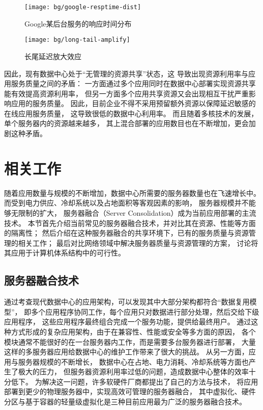 \begin{figure}
\begin{minipage}{0.44\textwidth}
  \centering
  \texttt{[image: bg/google-resptime-dist]}
  \caption[Google某后台服务的响应时间分布]{Google某后台服务的响应时间分布\cite{Krushevskaja:2013}}
  \label{fig:google-resptime-dist}
\end{minipage}\hfill
\begin{minipage}{0.52\textwidth}
  \centering
  \texttt{[image: bg/long-tail-amplify]}
  \caption[长尾延迟放大效应]{长尾延迟放大效应\cite{dean_tail_2013}}
  \label{fig:long-tail-amplify}
\end{minipage}
\end{figure}

因此，现有数据中心处于``无管理的资源共享''状态，这
导致出现资源利用率与应用服务质量之间的矛盾：
一方面通过多个应用同时在数据中心部署实现资源共享能有效提高资源利用率，
但另一方面多个应用共享资源又会出现相互干扰严重影响应用的服务质量。
因此，目前企业不得不采用预留额外资源以保障延迟敏感的在线应用服务质量，
这导致很低的数据中心利用率。
而且随着多核技术的发展，单个服务器内的资源越来越多，
其上混合部署的应用数目也在不断增加，更会加剧这种矛盾。

\section{相关工作}

随着应用数量与规模的不断增加，数据中心所需要的服务器数量也在飞速增长中。
而受到电力供应、冷却系统以及占地面积等客观因素的影响，
服务器规模并不能够无限制的扩大，
服务器融合（Server Consolidation）成为当前应用部署的主流技术。
本节首先介绍当前常见的服务器融合技术，并对比其在资源、性能等方面的隔离性；
然后介绍在这种服务器融合的共享环境下，已有的服务质量与资源管理的相关工作；
最后对比网络领域中解决服务器质量与资源管理的方案，
讨论将其应用于计算机体系结构中的可行性。

\subsection{服务器融合技术}

通过考查现代数据中心的应用架构，可以发现其中大部分架构都符合``数据复用模型''，
即多个应用程序协同工作，每个应用只对数据进行部分处理，然后交给下级应用程序，
这些应用程序最终组合完成一个服务功能，提供给最终用户。
通过这种方式形成的复杂应用架构，由于在兼容性、性能或安全等多方面的原因，
各个模块通常不能很好的在一台服务器内工作，而是需要多台服务器进行部署，
大量这样的多服务器应用给数据中心的维护工作带来了很大的挑战。
从另一方面，应用与服务器规模的不断增长，
数据中心在占地、电力消耗、冷却系统等方面也产生了极大的压力，
但服务器资源利用率过低的问题，造成数据中心整体的效率十分低下。
为解决这一问题，许多软硬件厂商都提出了自己的方法与技术，
将应用部署到更少的物理服务器中，实现高效可管理的服务器融合，
其中虚拟化、硬件分区与基于容器的轻量级虚拟化是三种目前应用最为广泛的服务器融合技术。

